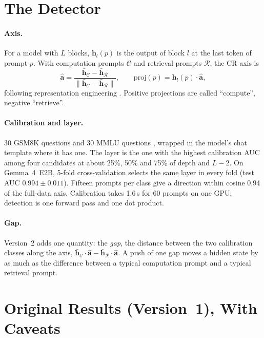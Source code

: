 \documentclass[11pt]{article}
\begin{document}
\section{The Detector}\label{sec:method}

\paragraph{Axis.} For a model with $L$ blocks, $\mathbf{h}_l(p)$ is the output of block $l$ at the last token of prompt $p$. With computation prompts $\mathcal{C}$ and retrieval prompts $\mathcal{R}$, the CR axis is
\begin{equation}
\hat{\mathbf{a}} = \frac{\bar{\mathbf{h}}_{\mathcal{C}} - \bar{\mathbf{h}}_{\mathcal{R}}}{\|\bar{\mathbf{h}}_{\mathcal{C}} - \bar{\mathbf{h}}_{\mathcal{R}}\|},
\qquad \text{proj}(p) = \mathbf{h}_l(p)\cdot\hat{\mathbf{a}},
\label{eq:axis}
\end{equation}
following representation engineering \citep{zou2023representation}. Positive projections are called ``compute'', negative ``retrieve''.

\paragraph{Calibration and layer.} 30 GSM8K questions \citep{cobbe2021gsm8k} and 30 MMLU questions \citep{hendrycks2021mmlu}, wrapped in the model's chat template where it has one. The layer is the one with the highest calibration AUC among four candidates at about 25\%, 50\% and 75\% of depth and $L-2$. On Gemma~4~E2B, 5-fold cross-validation selects the same layer in every fold (test AUC $0.994\pm0.011$). Fifteen prompts per class give a direction within cosine 0.94 of the full-data axis. Calibration takes 1.6\,s for 60 prompts on one GPU; detection is one forward pass and one dot product.

\paragraph{Gap.} Version~2 adds one quantity: the \emph{gap}, the distance between the two calibration classes along the axis, $\bar{\mathbf{h}}_{\mathcal{C}}\cdot\hat{\mathbf{a}} - \bar{\mathbf{h}}_{\mathcal{R}}\cdot\hat{\mathbf{a}}$. A push of one gap moves a hidden state by as much as the difference between a typical computation prompt and a typical retrieval prompt.

\section{Original Results (Version~1), With Caveats}\label{sec:original}
\end{document}
